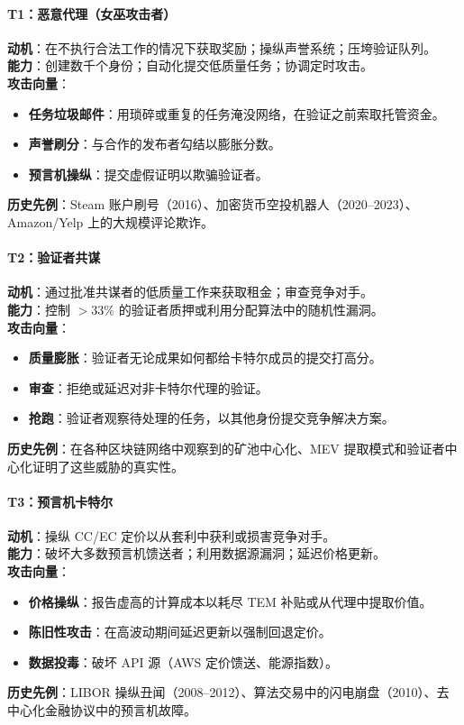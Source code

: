 \documentclass[11pt]{article}
\begin{document}
\paragraph{T1：恶意代理（女巫攻击者）}
\textbf{动机}：在不执行合法工作的情况下获取奖励；操纵声誉系统；压垮验证队列。\\
\textbf{能力}：创建数千个身份；自动化提交低质量任务；协调定时攻击。\\
\textbf{攻击向量}：
\begin{itemize}[noitemsep]
  \item \textbf{任务垃圾邮件}：用琐碎或重复的任务淹没网络，在验证之前索取托管资金。
  \item \textbf{声誉刷分}：与合作的发布者勾结以膨胀分数。
  \item \textbf{预言机操纵}：提交虚假证明以欺骗验证者。
\end{itemize}
\textbf{历史先例}：Steam 账户刷号（2016）、加密货币空投机器人（2020--2023）、Amazon/Yelp 上的大规模评论欺诈。

\paragraph{T2：验证者共谋}
\textbf{动机}：通过批准共谋者的低质量工作来获取租金；审查竞争对手。\\
\textbf{能力}：控制 $>33\%$ 的验证者质押或利用分配算法中的随机性漏洞。\\
\textbf{攻击向量}：
\begin{itemize}[noitemsep]
  \item \textbf{质量膨胀}：验证者无论成果如何都给卡特尔成员的提交打高分。
  \item \textbf{审查}：拒绝或延迟对非卡特尔代理的验证。
  \item \textbf{抢跑}：验证者观察待处理的任务，以其他身份提交竞争解决方案。
\end{itemize}
\textbf{历史先例}：在各种区块链网络中观察到的矿池中心化、MEV 提取模式和验证者中心化证明了这些威胁的真实性。

\paragraph{T3：预言机卡特尔}
\textbf{动机}：操纵 CC/EC 定价以从套利中获利或损害竞争对手。\\
\textbf{能力}：破坏大多数预言机馈送者；利用数据源漏洞；延迟价格更新。\\
\textbf{攻击向量}：
\begin{itemize}[noitemsep]
  \item \textbf{价格操纵}：报告虚高的计算成本以耗尽 TEM 补贴或从代理中提取价值。
  \item \textbf{陈旧性攻击}：在高波动期间延迟更新以强制回退定价。
  \item \textbf{数据投毒}：破坏 API 源（AWS 定价馈送、能源指数）。
\end{itemize}
\textbf{历史先例}：LIBOR 操纵丑闻（2008--2012）、算法交易中的闪电崩盘（2010）、去中心化金融协议中的预言机故障。
\end{document}
